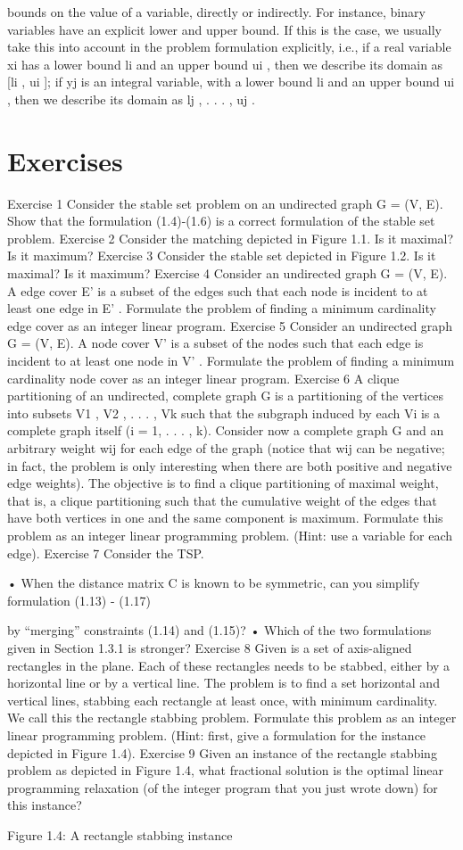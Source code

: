 \documentclass[titlepage]{book}
\begin{document}
bounds on the value of a variable, directly or indirectly. For instance, binary variables have an explicit
lower and upper bound. If this is the case, we usually take this into account in the problem formulation
explicitly, i.e., if a real variable xi has a lower bound li and an upper bound ui , then we describe its
domain as [li , ui ]; if yj is an integral variable, with a lower bound li and an upper bound ui , then we
describe its domain as {lj , . . . , uj }.

\section*{Exercises}
Exercise 1
Consider the stable set problem on an undirected graph G = (V, E). Show that the formulation (1.4)-(1.6)
is a correct formulation of the stable set problem.
Exercise 2
Consider the matching depicted in Figure 1.1. Is it maximal? Is it maximum?
Exercise 3
Consider the stable set depicted in Figure 1.2. Is it maximal? Is it maximum?
Exercise 4
Consider an undirected graph G = (V, E). A edge cover E' is a subset of the edges such that each node is
incident to at least one edge in E' . Formulate the problem of finding a minimum cardinality edge cover
as an integer linear program.
Exercise 5
Consider an undirected graph G = (V, E). A node cover V' is a subset of the nodes such that each edge
is incident to at least one node in V' . Formulate the problem of finding a minimum cardinality node
cover as an integer linear program.
Exercise 6
A clique partitioning of an undirected, complete graph G is a partitioning of the vertices into subsets
V1 , V2 , . . . , Vk such that the subgraph induced by each Vi is a complete graph itself (i = 1, . . . , k). Consider
now a complete graph G and an arbitrary weight wij for each edge of the graph (notice that wij can be
negative; in fact, the problem is only interesting when there are both positive and negative edge weights).
The objective is to find a clique partitioning of maximal weight, that is, a clique partitioning such that
the cumulative weight of the edges that have both vertices in one and the same component is maximum.
Formulate this problem as an integer linear programming problem. (Hint: use a variable for each edge).
Exercise 7
Consider the TSP.

• When the distance matrix C is known to be symmetric, can you simplify formulation (1.13) - (1.17)

by “merging” constraints (1.14) and (1.15)?
• Which of the two formulations given in Section 1.3.1 is stronger?
Exercise 8
Given is a set of axis-aligned rectangles in the plane. Each of these rectangles needs to be stabbed, either
by a horizontal line or by a vertical line. The problem is to find a set horizontal and vertical lines, stabbing
each rectangle at least once, with minimum cardinality. We call this the rectangle stabbing problem.
Formulate this problem as an integer linear programming problem. (Hint: first, give a formulation for
the instance depicted in Figure 1.4).
Exercise 9
Given an instance of the rectangle stabbing problem as depicted in Figure 1.4, what fractional solution
is the optimal linear programming relaxation (of the integer program that you just wrote down) for this
instance?

Figure 1.4: A rectangle stabbing instance



\end{document}
